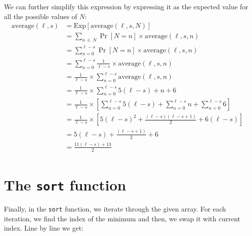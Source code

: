 \documentclass[11pt]{article}
\begin{document}
We can further simplify this expression by expressing it as the
expected value for all the possible values of \(N\):
\begin{align*}
   \text{average}(\ell, s) & = \text{Exp}[\text{average}(\ell, s, N)] \\
                           & = \sum_{n\,\in\, N} \Pr[N=n] \times \text{average}(\ell, s, n) \\
                           & = \sum_{n=0}^{\ell-s} \Pr[N=n] \times \text{average}(\ell, s, n) \\
                           & = \sum_{n=0}^{\ell-s} \frac{1}{\ell-s} \times \text{average}(\ell, s, n) \\
                           & = \frac{1}{\ell-s} \times \sum_{n=0}^{\ell-s} \text{average}(\ell, s, n) \\
                           & = \frac{1}{\ell-s} \times \sum_{n=0}^{\ell-s} 5(\ell-s) + n + 6 \\
                           & = \frac{1}{\ell-s} \times \left[ \sum_{n=0}^{\ell-s} 5(\ell-s) + \sum_{n=0}^{\ell-s} n + \sum_{n=0}^{\ell-s} 6 \right] \\
                           & = \frac{1}{\ell-s} \times \left[ 5(\ell-s)^2 + \frac{(\ell-s)(\ell-s+1)}{2} + 6(\ell-s) \right] \\
                           & = 5(\ell-s) + \frac{(\ell-s+1)}{2} + 6\\
                           &= \frac{11(\ell-s) + 13}{2}\\
\end{align*}

\section{The \texttt{sort} function}
\label{sec:org1f5fe51}

Finally, in the \texttt{sort} function, we iterate through the given
array. For each iteration, we find the index of the minimum and then,
we swap it with current index. Line by line we get:
\end{document}

